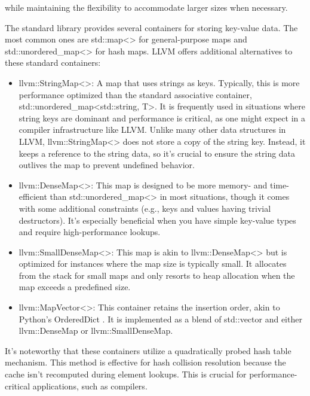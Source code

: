 while maintaining the flexibility to accommodate larger sizes when necessary.


The standard library provides several containers for storing key-value data. The most common ones are std::map<> for general-purpose maps and std::unordered\_map<> for hash maps. LLVM offers additional alternatives to these standard containers:

\begin{itemize}
\item
llvm::StringMap<>: A map that uses strings as keys. Typically, this is more performance optimized than the standard associative container, std::unordered\_map<std::string, T>. It is frequently used in situations where string keys are dominant and performance is critical, as one might expect in a compiler infrastructure like LLVM. Unlike many other data structures in LLVM, llvm::StringMap<> does not store a copy of the string key. Instead, it keeps a reference to the string data, so it's crucial to ensure the string data outlives the map to prevent undefined behavior.

\item
llvm::DenseMap<>: This map is designed to be more memory- and time-efficient than std::unordered\_map<> in most situations, though it comes with some additional constraints (e.g., keys and values having trivial destructors). It's especially beneficial when you have simple key-value types and require high-performance lookups.

\item
llvm::SmallDenseMap<>: This map is akin to llvm::DenseMap<> but is optimized for instances where the map size is typically small. It allocates from the stack for small maps and only resorts to heap allocation when the map exceeds a predefined size.

\item
llvm::MapVector<>: This container retains the insertion order, akin to Python's OrderedDict . It is implemented as a blend of std::vector and either llvm::DenseMap or llvm::SmallDenseMap.
\end{itemize}

It's noteworthy that these containers utilize a quadratically probed hash table mechanism. This method is effective for hash collision resolution because the cache isn't recomputed during element lookups. This is crucial for performance-critical applications, such as compilers.


